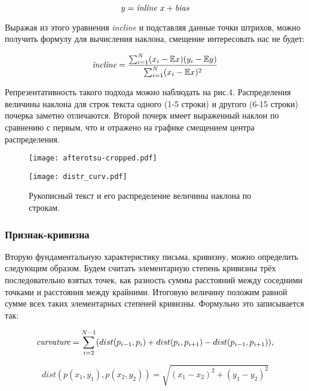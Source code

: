 \documentclass{article}
\begin{document}
\begin{equation}
y = \emph{inline}~ x + \emph{bias}
\end{equation}

Выражая из этого уравнения \emph{incline} и подставляя данные точки штрихов, можно получить формулу для вычисления наклона, смещение интересовать нас не будет:

\begin{equation}
\emph{incline} = \frac{\sum_{i=1}^{N}(x_i - \mathbb{E}x)(y_i - \mathbb{E}y)}{\sum_{i=1}^{N}(x_i - \mathbb{E}x)^2}
\end{equation}

Репрезентативность такого подхода можно наблюдать на рис.4. Распределения величины наклона для строк текста одного (1-5 строки) и другого (6-15 строки) почерка заметно отличаются. Второй почерк имеет выраженный наклон по сравнению с первым, что и отражено на графике смещением центра распределения. 

\begin{figure}[h]
\begin{minipage}[h]{0.5\linewidth}
    \centering
    \texttt{[image: afterotsu-cropped.pdf]} 
\end{minipage}
\hfill
\begin{minipage}[h]{0.46\linewidth}
    \centering
    \texttt{[image: distr\_curv.pdf]}
\end{minipage}
\caption{Рукописный текст и его распределение величины наклона по строкам.}
\end{figure}

\subsubsection{Признак-кривизна}
Вторую фундаментальную характеристику письма, кривизну, можно определить следующим образом. Будем считать элементарную степень кривизны трёх последовательно взятых точек, как разность суммы расстояний между соседними точками и расстояния между крайними. Итоговую величину положим равной сумме всех таких элементарных степеней кривизны. Формульно это записывается так:

\begin{equation}
\emph{curvature} = \sum_{i=2}^{N-1}(dist(p_{i-1}, p_{i}) + dist(p_{i}, p_{i+1}) - dist(p_{i-1}, p_{i+1})),
\end{equation}

\begin{equation}
dist(p(x_1, y_1), p(x_2, y_2)) = \sqrt{(x_1 - x_2)^2 + (y_1 - y_2)^2}
\end{equation}
\end{document}
